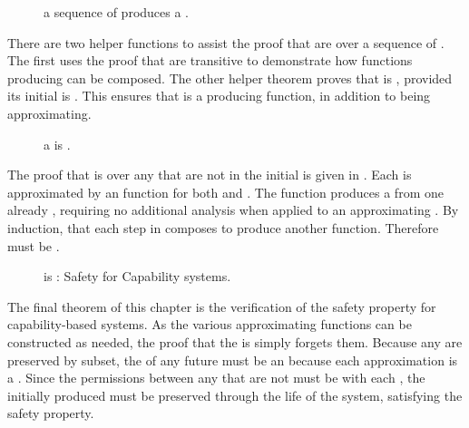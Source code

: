 \begin{figure}
  \COQDOCpotAccExecuteSpecPotAcc{}
  \caption{\xmakefirstuc{\TMexecuting{}} a sequence of \TMpotAcc{} \TMops{} produces a \TMmaximal{} \TMaccessGraph{}.}
\end{figure}

There are two helper functions to assist the proof that \TMaccessGraphs{} are \TMattenuating{} over a sequence of \TMops{}.
The first uses the proof that \TMattenuations{} are transitive to demonstrate how functions producing \TMattenuations{} can be composed.
The other helper theorem proves that \COQpotAccExecute{} is \TMmaximal{}, provided its initial \TMaccessGraph{} is \TMmaximal{}.
This ensures that \COQpotAccExecute{} is a \TMpotAccAG{} producing function, in addition to being \TMpotAcc{} approximating.

\begin{figure}
  \COQDOCexecutePotAccReduce{}
  \caption{\xmakefirstuc{\TMexecuting{}} a \TMpotAcc{} \TMop{} is \TMattenuating{}. \label{fig:safety:executePotAccReduce}}
\end{figure}

The proof that \COQpotAccExecute{} is \TMattenuating{} over any \TMobjs{} that are not \TMunborn{} in the initial \TMsystemState{} is given in .
Each \TMop{} is approximated by an \TMattenuating{} function for both \TMdirAcc{} and \TMpotAcc{}.
The \TMattenuating{} \COQpotAccExecute{} function produces a \TMmaximal{} \TMaccessGraph{} from one already \TMmaximal{}, requiring no additional analysis when applied to an approximating \TMpotAccAG{}.
By induction, that each step in \COQpotAccExecute{} composes to produce another \TMattenuating{} function.
Therefore \COQpotAccExecute{} must be \TMattenuating{}.

\begin{figure}
  \COQDOCexecuteReduce{}
  \caption{\xmakefirstuc{\TMexecution} is \TMattenuating{}: Safety for Capability systems.}
\end{figure}

The final theorem of this chapter is the verification of the safety property for capability-based systems.
As the various approximating functions can be constructed as needed, the proof that the \TMpotAcc{} is \TMattenuating{} simply forgets them.
Because any \TMattenuations{} are preserved by subset, the \TMpotAcc{} of any future \TMsystemState{} must be an \TMattenuation{} because each approximation is a \TMattenuation{}.
Since the permissions between any \TMobjs{} that are not \TMunborn{} must be \TMattenuating{} with each \TMop{}, the \TMpotAcc{} initially produced must be preserved through the life of the system, satisfying the safety property.
